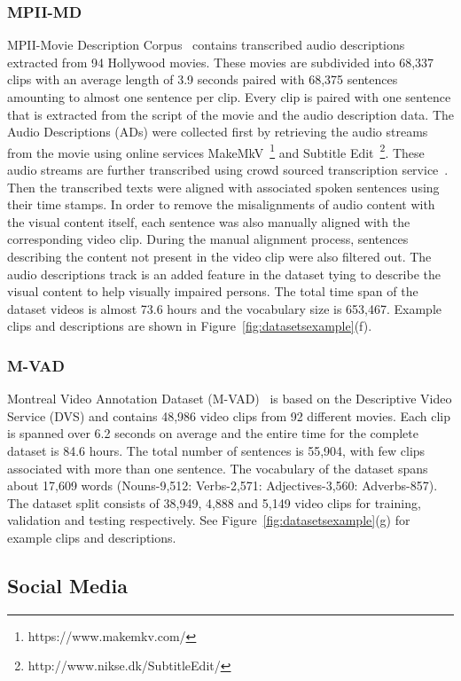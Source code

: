 \documentclass[10pt,journal,compsoc]{IEEEtran}
\begin{document}
\subsubsection{MPII-MD}
MPII-Movie Description Corpus~\cite{rohrbach2015dataset} contains transcribed audio descriptions extracted from 94 Hollywood movies. These movies are subdivided into 68,337 clips with an average length of 3.9 seconds paired with 68,375 sentences amounting to almost one sentence per clip. Every clip is paired with one sentence that is extracted from the script of the movie and the audio description data. 
The Audio Descriptions (ADs) were collected first by retrieving the audio streams from the movie using online services MakeMkV~\footnote{https://www.makemkv.com/} and Subtitle Edit~\footnote{http://www.nikse.dk/SubtitleEdit/}. These audio streams are further transcribed using crowd sourced transcription service~\cite{castingwords}. Then the transcribed texts were aligned with associated spoken sentences using their time stamps. In order to remove the misalignments of audio content with the visual content itself, each sentence was also manually aligned with the corresponding video clip. During the manual alignment process, sentences describing the content not present in the video clip were also filtered out. The audio descriptions track is an added feature in the dataset tying to describe the visual content to help visually impaired persons. The total time span of the dataset videos is almost 73.6 hours and the vocabulary size is 653,467. Example clips and descriptions are shown in Figure~\ref{fig:datasetsexample}(f).

\subsubsection{M-VAD}
Montreal Video Annotation Dataset (M-VAD)~\cite{torabi2015using} is based on the Descriptive Video Service (DVS) and contains 48,986 video clips from 92 different movies. Each clip is spanned over 6.2 seconds on average and the entire time for the complete dataset is 84.6 hours. The total number of sentences is 55,904, with few clips associated with more than one sentence. The vocabulary of the dataset spans about 17,609 words (Nouns-9,512: Verbs-2,571: Adjectives-3,560: Adverbs-857). The dataset split consists of 38,949, 4,888 and 5,149 video clips for training, validation and testing respectively. See Figure~\ref{fig:datasetsexample}(g) for example clips and descriptions.

\subsection{Social Media} 
\end{document}
